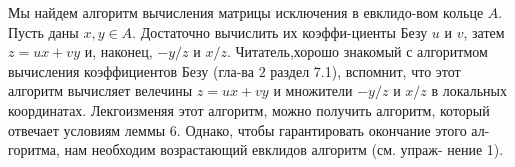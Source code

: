   Мы найдем алгоритм вычисления матрицы исключения в евклидо-\linebreak вом кольце $A$. Пусть даны $x, y \in A$. Достаточно вычислить их коэффи-\linebreak циенты Безу $u$ и $v$, затем $z=ux+vy$ и, наконец, $-y/z$ и $x/z$. Читатель,\linebreak хорошо знакомый с алгоритмом вычисления коэффициентов Безу (гла-\linebreak ва $2$ раздел 7.1), вспомнит, что этот алгоритм вычисляет велечины \linebreak $z=ux+vy$ и множители $-y/z$ и $x/z$ в локальных координатах. Лекго\linebreak изменяя этот алгоритм, можно получить алгоритм, который отвечает \linebreak условиям леммы 6. Однако, чтобы гарантировать окончание этого ал-\linebreak горитма, нам необходим возрастающий евклидов алгоритм (см. упраж- \linebreak нение 1).
\\
\\
